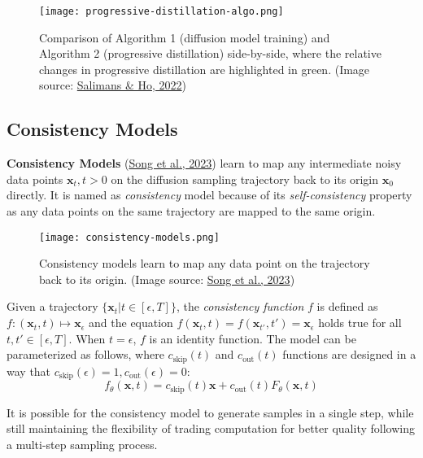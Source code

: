 \documentclass[12pt]{article}
\begin{document}
\begin{figure}[H]
    \centering
    \texttt{[image: progressive-distillation-algo.png]}
    \caption{Comparison of Algorithm 1 (diffusion model training) and Algorithm 2 (progressive distillation) side-by-side, where the relative changes in progressive distillation are highlighted in green. (Image source: \href{https://arxiv.org/abs/2202.00512}{Salimans \& Ho, 2022})}
\end{figure}

\subsection{Consistency Models}
\label{consistency}
\textbf{Consistency Models} (\href{https://arxiv.org/abs/2303.01469}{Song et al., 2023}) learn to map any intermediate noisy data points $\mathbf{x}_t, t > 0$ on the diffusion sampling trajectory back to its origin $\mathbf{x}_0$ directly. It is named as \emph{consistency} model because of its \emph{self-consistency} property as any data points on the same trajectory are mapped to the same origin.

\begin{figure}[H]
    \centering
    \texttt{[image: consistency-models.png]}
    \caption{Consistency models learn to map any data point on the trajectory back to its origin. (Image source: \href{https://arxiv.org/abs/2303.01469}{Song et al., 2023})}
\end{figure}

Given a trajectory $\{\mathbf{x}_t \vert t \in [\epsilon, T]\}$, the \emph{consistency function} $f$ is defined as $f: (\mathbf{x}_t, t) \mapsto \mathbf{x}_\epsilon$ and the equation $f(\mathbf{x}_t, t) = f(\mathbf{x}_{t'}, t') = \mathbf{x}_\epsilon$ holds true for all $t, t' \in [\epsilon, T]$. When $t=\epsilon$, $f$ is an identity function. The model can be parameterized as follows, where $c_\text{skip}(t)$ and $c_\text{out}(t)$ functions are designed in a way that $c_\text{skip}(\epsilon) = 1, c_\text{out}(\epsilon) = 0$:
\[
f_\theta(\mathbf{x}, t) = c_\text{skip}(t)\mathbf{x} + c_\text{out}(t) F_\theta(\mathbf{x}, t)
\]

It is possible for the consistency model to generate samples in a single step, while still maintaining the flexibility of trading computation for better quality following a multi-step sampling process.
\end{document}
